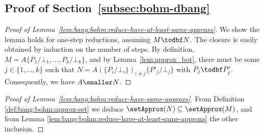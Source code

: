 \subsection{Proof of Section~\ref{subsec:bohm-dbang}}

\begin{proof}[Proof of Lemma~\ref{lem:bang:bohm:reduce-have-at-least-same-approxs}]
	We show the lemma holds for one-step reductions, assuming $M\todbf N$. The closure is easily
	obtained  by induction on the number of steps. By definition,
	$M=A\{P_1/\bot_1,\dots ,P_k/\bot_k\}$, and by Lemma~\ref{lem:approx_bot}, there
	must be some $j\in\{1,\dots ,k\}$ such that $N=A(\{P_i/\bot_i\})_{i\neq
	j}\{P'_j/\bot_j\}$ with $P_j\todbf P_j'$. Consequently, we have
	$A\smaller N$.
\end{proof}

\begin{proof}[Proof of Lemma~\ref{lem:bang:bohm:reduce-have-same-approxs}]
	From Definition \ref{def:bang:bohm:approx-set} we deduce
	$\setApprox(N) \subseteq \setApprox(M)$, and from Lemma \ref{lem:bang:bohm:reduce-have-at-least-same-approxs} the other inclusion. 
\end{proof}


